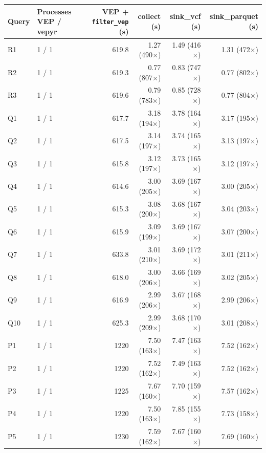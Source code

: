 \begin{tabular}{llrrrr}
\toprule
Query & Processes VEP / vepyr & VEP + \texttt{filter\_vep} (s) & collect (s) & sink\_vcf (s) & sink\_parquet (s) \\
\midrule
R1 & 1 / 1 & 619.8 & 1.27 (490$\times$) & 1.49 (416$\times$) & 1.31 (472$\times$) \\
R2 & 1 / 1 & 619.3 & 0.77 (807$\times$) & 0.83 (747$\times$) & 0.77 (802$\times$) \\
R3 & 1 / 1 & 619.6 & 0.79 (783$\times$) & 0.85 (728$\times$) & 0.77 (804$\times$) \\
Q1 & 1 / 1 & 617.7 & 3.18 (194$\times$) & 3.78 (164$\times$) & 3.17 (195$\times$) \\
Q2 & 1 / 1 & 617.5 & 3.14 (197$\times$) & 3.74 (165$\times$) & 3.13 (197$\times$) \\
Q3 & 1 / 1 & 615.8 & 3.12 (197$\times$) & 3.73 (165$\times$) & 3.12 (197$\times$) \\
Q4 & 1 / 1 & 614.6 & 3.00 (205$\times$) & 3.69 (167$\times$) & 3.00 (205$\times$) \\
Q5 & 1 / 1 & 615.3 & 3.08 (200$\times$) & 3.68 (167$\times$) & 3.04 (203$\times$) \\
Q6 & 1 / 1 & 615.9 & 3.09 (199$\times$) & 3.69 (167$\times$) & 3.07 (200$\times$) \\
Q7 & 1 / 1 & 633.8 & 3.01 (210$\times$) & 3.69 (172$\times$) & 3.01 (211$\times$) \\
Q8 & 1 / 1 & 618.0 & 3.00 (206$\times$) & 3.66 (169$\times$) & 3.02 (205$\times$) \\
Q9 & 1 / 1 & 616.9 & 2.99 (206$\times$) & 3.67 (168$\times$) & 2.99 (206$\times$) \\
Q10 & 1 / 1 & 625.3 & 2.99 (209$\times$) & 3.68 (170$\times$) & 3.01 (208$\times$) \\
P1 & 1 / 1 & 1220 & 7.50 (163$\times$) & 7.47 (163$\times$) & 7.52 (162$\times$) \\
P2 & 1 / 1 & 1220 & 7.52 (162$\times$) & 7.49 (163$\times$) & 7.52 (162$\times$) \\
P3 & 1 / 1 & 1225 & 7.67 (160$\times$) & 7.70 (159$\times$) & 7.57 (162$\times$) \\
P4 & 1 / 1 & 1220 & 7.50 (163$\times$) & 7.85 (155$\times$) & 7.73 (158$\times$) \\
P5 & 1 / 1 & 1230 & 7.59 (162$\times$) & 7.67 (160$\times$) & 7.69 (160$\times$) \\
\bottomrule
\end{tabular}
